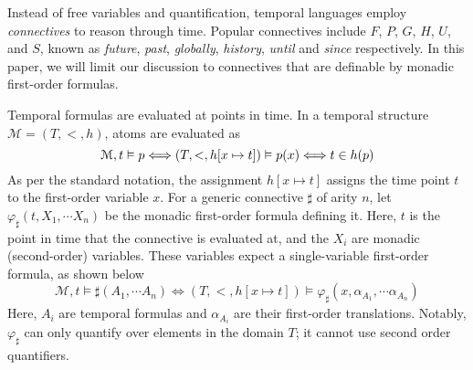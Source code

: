 \documentclass[a4paper,UKenglish,cleveref, autoref, thm-restate, numberwithinsect]{lipics-v2021}
\begin{document}
Instead of free variables and quantification, temporal languages employ \textit{connectives} to reason through time. Popular connectives include $F$, $P$, $G$, $H$, $U$, and $S$, known as \textit{future}, \textit{past}, \textit{globally}, \textit{history}, \textit{until} and \textit{since} respectively. In this paper, we will limit our discussion to connectives that are definable by monadic first-order formulas.

Temporal formulas are evaluated at points in time. In a temporal structure $\mathcal{M} = (T, <, h)$, atoms are evaluated as
\begin{equation*}
    \mathcal{M}, t \vDash p \Longleftrightarrow (T, <, h[x \mapsto t]) \vDash p(x) \Longleftrightarrow t \in h(p)\\
\end{equation*}
As per the standard notation, the assignment $h[x \mapsto t]$ assigns the time point $t$ to the first-order variable $x$. For a generic connective $\sharp$ of arity $n$, let $\varphi_\sharp(t, X_1, \cdots X_n)$ be the monadic first-order formula defining it. Here, $t$ is the point in time that the connective is evaluated at, and the $X_i$ are monadic (second-order) variables. These variables expect a single-variable first-order formula, as shown below
\begin{equation*}
    \mathcal{M}, t \vDash \sharp(A_1, \cdots A_n) \Longleftrightarrow (T, <, h[x \mapsto t]) \vDash \varphi_\sharp(x, \alpha_{A_1}, \cdots \alpha_{A_n})
\end{equation*}
Here, $A_i$ are temporal formulas and $\alpha_{A_i}$ are their first-order translations. Notably, $\varphi_\sharp$ can only quantify over elements in the domain $T$; it cannot use second order quantifiers.
\end{document}
